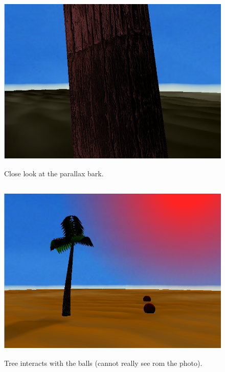 \documentclass[annual]{acmsiggraph}
\begin{document}
\begin{figure}
\begin{center}
\includegraphics[width=500pt, height = 250pt]{fig3.png}
\caption{Close look at the parallax bark.}
\end{center}
\end{figure}

\begin{figure}
\begin{center}
\includegraphics[width=500pt, height = 250pt]{fig4.png}
\caption{Tree interacts with the balls (cannot really see rom the photo).}
\end{center}
\end{figure}
\end{document}
